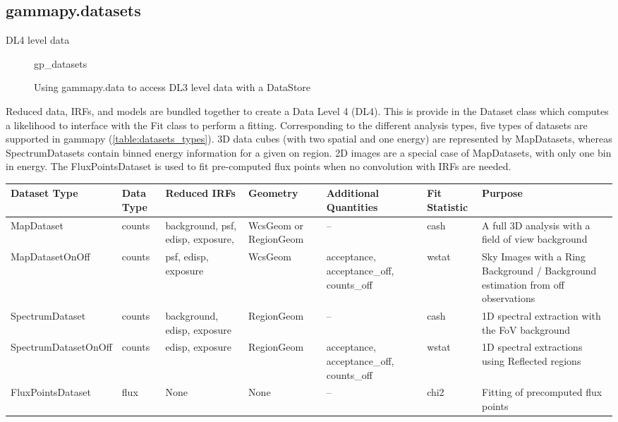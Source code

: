 \subsection{gammapy.datasets}
\label{ssec:gammapy-datasets}
DL4 level data

\begin{figure}

	{gp_datasets}
	\caption{Using gammapy.data to access DL3 level data with a DataStore}
	\label{fig*:minted:gp_datasets}
\end{figure}

Reduced data, IRFs, and models are bundled together to create a Data Level 4 (DL4). This is provide in the Dataset class which computes a likelihood to interface with the Fit class to perform a fitting. Corresponding to the different analysis types, five types of datasets are supported in gammapy (\ref{table:datasets_types}). 3D data cubes (with two spatial and one energy) are represented by MapDatasets, whereas SpectrumDatasets contain binned energy information for a given on region. 2D images are a special case of MapDatasets, with only one bin in energy. The FluxPointsDataset is used to fit pre-computed flux points when no convolution with IRFs are needed.   

\begin{table*}[!ht]
    \centering
    \begin{tabular}{|l|l|l|l|l|l|l|}
    \hline
        Dataset Type & Data Type & Reduced IRFs & Geometry & Additional Quantities & Fit Statistic & Purpose \\ \hline
        MapDataset & counts & background, psf, edisp, exposure, & WcsGeom or RegionGeom & -- & cash & A full 3D analysis with a field of view background \\ \hline
        MapDatasetOnOff & counts & psf, edisp, exposure & WcsGeom & acceptance, acceptance\_off, counts\_off & wstat & Sky Images with a Ring Background / Background estimation from off observations \\ \hline
        SpectrumDataset & counts & background, edisp, exposure & RegionGeom & -- & cash & 1D spectral extraction with the FoV background \\ \hline
        SpectrumDatasetOnOff & counts & edisp, exposure & RegionGeom & acceptance, acceptance\_off, counts\_off & wstat & 1D spectral extractions using Reflected regions \\ \hline
        FluxPointsDataset & flux & None & None & -- & chi2 & Fitting of precomputed flux points \\ \hline
    \end{tabular}
    \caption{Some caption.}
    \label{table:datasets_types}
\end{table*}


